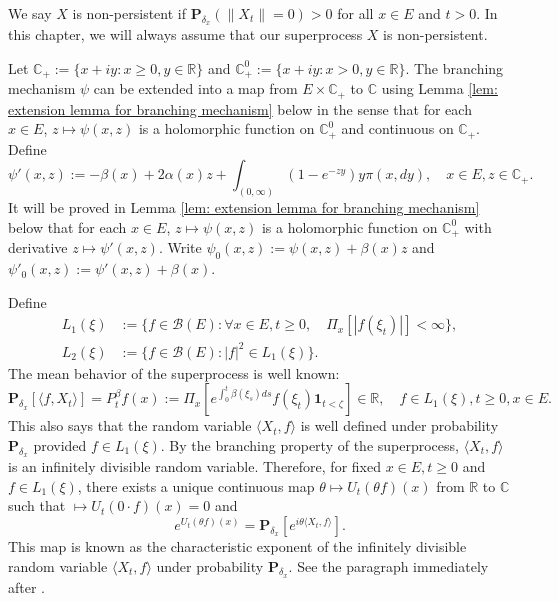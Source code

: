 \documentclass[UTF8]{pkuthss}
\theoremstyle{plain}
\theoremstyle{definition}
\numberwithin{equation}{section}
\begin{document}
    We say $X$ is non-persistent if $\mathbf P_{\delta_x}(\|X_t\| = 0)>0$ for all $x\in E$ and $t >0$. 
    In this chapter, we will always assume that our superprocess $X$ is non-persistent.

    Let $\mathbb C_+:=\{x+iy:x\geq 0, y\in \mathbb R\}$ and $\mathbb C_+^0:=\{x+iy: x>0, y\in \mathbb R\}$.
    The branching mechanism $\psi$ can be extended into a map from $E \times \mathbb C_+$ to $\mathbb C$ using Lemma \ref{lem: extension lemma for branching mechanism} below in the sense that for each $x\in E$, $z\mapsto \psi(x,z)$ is a holomorphic function on $\mathbb C_+^0$ and continuous on $\mathbb C_+$.
    Define
\begin{equation}
    \psi'(x,z):= - \beta(x) + 2\alpha(x) z + \int_{(0,\infty)} (1-e^{-zy})y\pi(x,dy),
    \quad x\in E, z\in \mathbb C_+.
\end{equation}
    It will be proved in Lemma \ref{lem: extension lemma for branching mechanism} below that for each $x \in E$, $z \mapsto \psi(x,z)$ is a holomorphic function on $\mathbb C_+^0$ with derivative $z \mapsto \psi'(x,z)$.
    Write $\psi_0(x,z) := \psi(x,z)+ \beta(x)z $ and $\psi'_0(x,z) := \psi'(x,z) + \beta(x)$.

    Define
\begin{align}
    L_1(\xi)
    &:= \{f\in \mathcal B(E): \forall x\in E, t\geq 0, \quad \Pi_x[|f(\xi_t)|]< \infty\},
    \\L_2(\xi)
    &:= \{f \in \mathcal B(E): |f|^2 \in L_1(\xi)\}.
\end{align}
    The mean behavior of the superprocess is well known:
\begin{equation}   
    \mathbf P_{\delta_x}[\langle f, X_t\rangle]
    =P^{\beta}_t f(x):= \Pi_x[e^{\int_0^t \beta(\xi_s)ds}f(\xi_t)\mathbf 1_{t < \zeta}] \in \mathbb R,
    \quad f\in L_1(\xi), t \geq 0,x\in E.
\end{equation}
    This also says that the random variable $\langle X_t, f\rangle$ is well defined under probability $\mathbf P_{\delta_x}$ provided $f\in L_1(\xi)$.
    By the branching property of the superprocess, $\langle X_t, f\rangle$ is an infinitely divisible random variable.
    Therefore, for fixed $x\in E, t\geq 0$ and $f\in L_1(\xi)$, there exists a unique continuous map $\theta \mapsto U_t(\theta f)(x)$ from $\mathbb R$ to $\mathbb C$ such that $\mapsto U_t(0\cdot f)(x) = 0$ and
\[
    e^{U_t(\theta f)(x)} = \mathbf P_{\delta_x}[e^{i\theta \langle X_t,f\rangle}].
\]
    This map is known as the characteristic exponent of the infinitely divisible random variable $\langle X_t,f\rangle$ under probability $\mathbf P_{\delta_x}$. 
    See the paragraph immediately after \cite[Lemma 7.6]{Sato2013Levy}.
\end{document}
